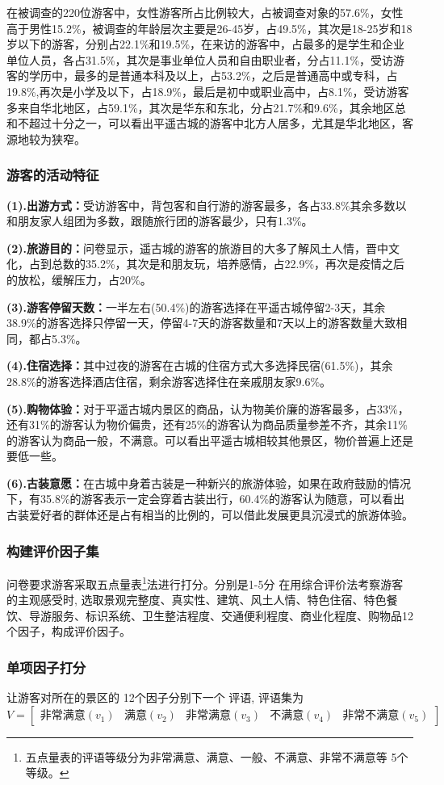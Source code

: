\documentclass[UTF8]{ctexart}
\begin{document}
在被调查的220位游客中，女性游客所占比例较大，占被调查对象的57.6\%，女性高于男性15.2\%，被调查的年龄层次主要是26-45岁，占49.5\%，其次是18-25岁和18岁以下的游客，分别占22.1\%和19.5\%，在来访的游客中，占最多的是学生和企业单位人员，各占31.5\%，其次是事业单位人员和自由职业者，分占11.1\%，受访游客的学历中，最多的是普通本科及以上，占53.2\%，之后是普通高中或专科，占19.8\%,再次是小学及以下，占18.9\%，最后是初中或职业高中，占8.1\%，受访游客多来自华北地区，占59.1\%，其次是华东和东北，分占21.7\%和9.6\%，其余地区总和不超过十分之一，可以看出平遥古城的游客中北方人居多，尤其是华北地区，客源地较为狭窄。
\subsubsection{游客的活动特征}
\textbf{(1).出游方式：}受访游客中，背包客和自行游的游客最多，各占33.8\%其余多数以和朋友家人组团为多数，跟随旅行团的游客最少，只有1.3\%。

\textbf{(2).旅游目的：}问卷显示，遥古城的游客的旅游目的大多了解风土人情，晋中文化，占到总数的35.2\%，其次是和朋友玩，培养感情，占22.9\%，再次是疫情之后的放松，缓解压力，占20\%。

\textbf{(3).游客停留天数：}一半左右(50.4\%)的游客选择在平遥古城停留2-3天，其余38.9\%的游客选择只停留一天，停留4-7天的游客数量和7天以上的游客数量大致相同，都占5.3\%。

\textbf{(4).住宿选择：}其中过夜的游客在古城的住宿方式大多选择民宿(61.5\%)，其余28.8\%的游客选择酒店住宿，剩余游客选择住在亲戚朋友家9.6\%。

\textbf{(5).购物体验：}对于平遥古城内景区的商品，认为物美价廉的游客最多，占33\%，还有31\%的游客认为物价偏贵，还有25\%的游客认为商品质量参差不齐，其余11\%的游客认为商品一般，不满意。可以看出平遥古城相较其他景区，物价普遍上还是要低一些。

\textbf{(6).古装意愿：}在古城中身着古装是一种新兴的旅游体验，如果在政府鼓励的情况下，有35.8\%的游客表示一定会穿着古装出行，60.4\%的游客认为随意，可以看出古装爱好者的群体还是占有相当的比例的，可以借此发展更具沉浸式的旅游体验。
\subsubsection{构建评价因子集}
问卷要求游客采取五点量表\footnote{五点量表的评语等级分为非常满意、满意、一般、不满意、非常不满意等 5个等级。}法进行打分。分别是1-5分
在用综合评价法考察游客的主观感受时, 选取景观完整度、真实性、建筑、风土人情、特色住宿、特色餐饮、导游服务、标识系统、卫生整洁程度、交通便利程度、商业化程度、购物品12个因子，构成评价因子。
\subsubsection{单项因子打分}
让游客对所在的景区的 12个因子分别下一个 评语, 评语集为
\[V=
\begin{bmatrix}
\text{非常满意}(v_1)&\text{满意}(v_2)&\text{非常满意}(v_3)&\text{不满意}(v_4)&\text{非常不满意}(v_5)
\end{bmatrix}
\]
\end{document}
